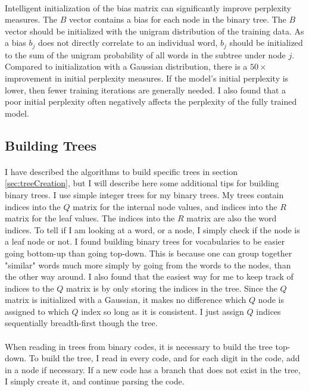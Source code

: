\paragraph{}
Intelligent initialization of the bias matrix can significantly improve perplexity measures. The $B$ vector contains a bias for each node in the binary tree.  The $B$ vector should be initialized with the unigram distribution of the training data. As a bias $b_j$ does not directly correlate to an individual word, $b_j$ should be initialized to the sum of the unigram probability of all words in the subtree under node $j$.  Compared to initialization with a Gaussian distribution, there is a $50\times$ improvement in initial perplexity measures. If the model's initial perplexity is lower, then fewer training iterations are generally needed. I also found that a poor initial perplexity often negatively affects the perplexity of the fully trained model.

\subsection{Building Trees}
\paragraph{}
I have described the algorithms to build specific trees in section \ref{sec:treeCreation}, but I will describe here some additional tips for building binary trees. I use simple integer trees for my binary trees. My trees contain indices into the $Q$ matrix for the internal node values, and indices into the $R$ matrix for the leaf values. The indices into the $R$ matrix are also the word indices. To tell if I am looking at a word, or a node, I simply check if the node is a leaf node or not.  I found building binary trees for vocabularies to be easier going bottom-up than going top-down. This is because one can group together "similar" words much more simply by going from the words to the nodes, than the other way around. I also found that the easiest way for me to keep track of indices to the $Q$ matrix is by only storing the indices in the tree. Since the $Q$ matrix is initialized with a Gaussian, it makes no difference which $Q$ node is assigned to which $Q$ index so long as it is consistent. I just assign $Q$ indices sequentially breadth-first though the tree. 
\paragraph{}
When reading in trees from binary codes, it is necessary to build the tree top-down. To build the tree, I read in every code, and for each digit in the code, add in a node if necessary. If a new code has a branch that does not exist in the tree, I simply create it, and continue parsing the code.

